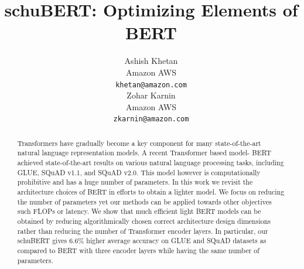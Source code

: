 \documentclass[11pt,a4paper]{article}
\title{schuBERT: Optimizing Elements of BERT}
\author{Ashish Khetan \\
  Amazon AWS \\
  \texttt{khetan@amazon.com} \\\And
  Zohar Karnin \\
 Amazon AWS \\
  \texttt{zkarnin@amazon.com} \\}
\date{}
\newcommand{\zk}[1]{{\color{blue}ZK:#1}} %
\begin{document}
\maketitle
\begin{abstract}
Transformers \citep{vaswani2017attention} have gradually become a key component for many state-of-the-art natural language representation models. A recent Transformer based model- BERT \citep{devlin2018bert} achieved state-of-the-art results on various natural language processing tasks, including GLUE, SQuAD v1.1, and SQuAD v2.0. This model however is computationally prohibitive and has a huge number of parameters. In this work we revisit the architecture choices of BERT in efforts to obtain a lighter model. We focus on reducing the number of parameters yet our methods can be applied towards other objectives such FLOPs or latency. We show that much efficient light BERT models can be obtained by reducing algorithmically chosen correct architecture design dimensions rather than reducing the number of Transformer encoder layers. In particular, our schuBERT gives $6.6\%$ higher average accuracy on GLUE and SQuAD datasets as compared to BERT with three encoder layers while having the same number of parameters. 
%
%
%
% 
%
\end{abstract}
\end{document}
